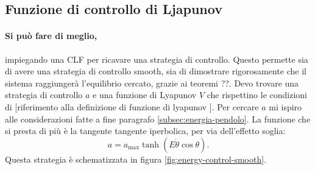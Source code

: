 \subsection{Funzione di controllo di Ljapunov}
\paragraph{Si può fare di meglio,} impiegando una CLF per ricavare una strategia di controllo. Questo permette sia di avere una strategia di controllo smooth, sia di dimostrare rigorosamente che il sistema raggiungerà l'equilibrio cercato, grazie ai teoremi ??.
Devo trovare una strategia di controllo $a$ e una funzione di Lyapunov $V$ che rispettino le condizioni di [riferimento alla definizione di funzione di lyapunov ].
Per cercare $a$ mi ispiro alle considerazioni fatte a fine paragrafo \ref{subsec:energia-pendolo}. La funzione che si presta di più è la tangente tangente iperbolica, per via dell'effetto soglia:
\begin{equation}
    a = a_{\max} \tanh(E \dot \theta \cos \theta).
    \label{eq:control-strategy-test}
\end{equation}
Questa strategia è schematizzata in figura \ref{fig:energy-control-smooth}.

